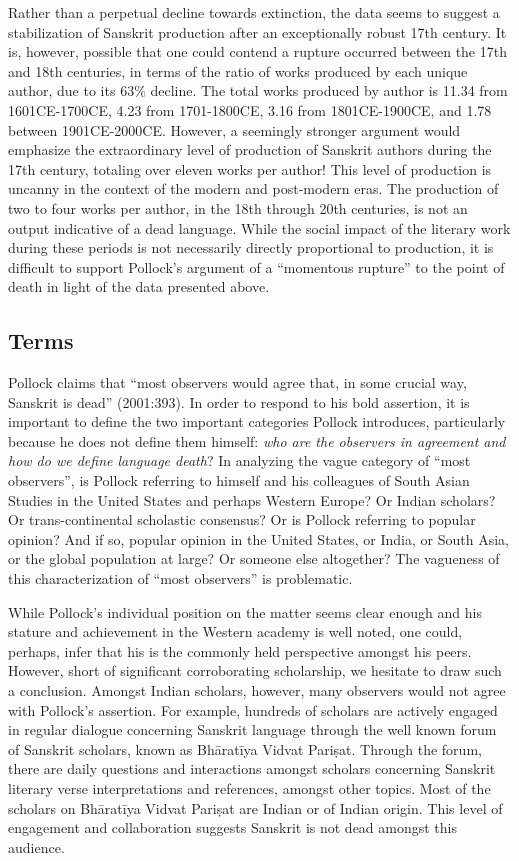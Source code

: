 Rather than a perpetual decline towards extinction, the data seems to suggest a stabilization of Sanskrit production after an exceptionally robust 17th century. It is, however, possible that one could contend a rupture occurred between the 17th and 18th centuries, in terms of the ratio of works produced by each unique author, due to its 63\% decline. The total works produced by author is 11.34 from 1601CE-1700CE, 4.23 from 1701-1800CE, 3.16 from 1801CE-1900CE, and 1.78 between 1901CE-2000CE. However, a seemingly stronger argument would emphasize the extraordinary level of production of Sanskrit authors during the 17th century, totaling over eleven works per author! This level of production is uncanny in the context of the modern and post-modern eras. The production of two to four works per author, in the 18th through 20th centuries, is not an output indicative of a dead language. While the social impact of the literary work during these periods is not necessarily directly proportional to production, it is difficult to support Pollock’s argument of a “momentous rupture” to the point of death in light of the data presented above. 
\vskip-10pt

\subsection*{Terms}
\vskip -3pt

Pollock claims that “most observers would agree that, in some crucial way, Sanskrit is dead” (2001:393). In order to respond to his bold assertion, it is important to define the two important categories Pollock introduces, particularly because he does not define them himself: {\sl who are the observers in agreement and how do we define language death}? In analyzing the vague category of “most observers”, is Pollock referring to himself and his colleagues of South Asian Studies in the United States and perhaps Western Europe? Or Indian scholars? Or trans-continental scholastic consensus? Or is Pollock referring to popular opinion? And if so, popular opinion in the United States, or India, or South Asia, or the global population at large? Or someone else altogether? The vagueness of this characterization of “most observers” is problematic. 

While Pollock’s individual position on the matter seems clear enough and his stature and achievement in the Western academy is well noted, one could, perhaps, infer that his is the commonly held perspective amongst his peers. However, short of significant corroborating scholarship, we hesitate to draw such a conclusion. Amongst Indian scholars, however, many observers would not agree with Pollock’s assertion. For example, hundreds of scholars are actively engaged in regular dialogue concerning Sanskrit language through the well known forum of Sanskrit scholars, known as Bhāratīya Vidvat Pariṣat. Through the forum, there are daily questions and interactions amongst scholars concerning Sanskrit literary verse interpretations and references, amongst other topics. Most of the scholars on Bhāratīya Vidvat Pariṣat are Indian or of Indian origin. This level of engagement and collaboration suggests Sanskrit is not dead amongst this audience. 

